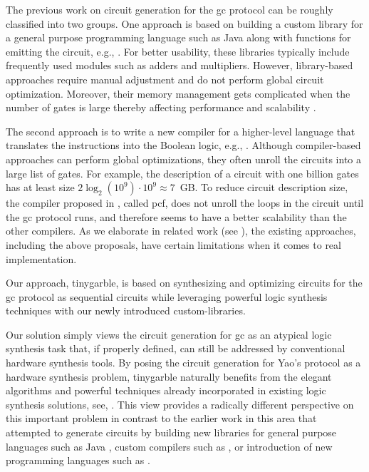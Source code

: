 The previous work on circuit generation for the \acrshort{gc} protocol can be roughly classified into two groups.
One approach is based on building a custom library for a general purpose programming language such as Java along with functions for emitting the circuit, e.g., \cite{huang2011faster,malka2011vmcrypt,henecka2013faster}.
For better usability, these libraries typically include frequently used modules such as adders and multipliers.
However, library-based approaches require manual adjustment and do not perform global circuit optimization.
Moreover, their memory management gets complicated when the number of gates is large thereby affecting performance and scalability \cite{henecka2013faster}.

The second approach is to write a new compiler for a higher-level language that translates the instructions into the Boolean logic, e.g., \cite{malkhi2004fairplay,kreuter2012billion,kreuter2013pcf,franz2014cbmc}.
Although compiler-based approaches can perform global optimizations, they often unroll the circuits into a large list of gates.
For example, the description of a circuit with one billion gates has at least size $2 \log_2 (10^9) \cdot 10^{9} \approx 7$~GB.
To reduce circuit description size, the compiler proposed in \cite{kreuter2013pcf}, called \gls{pcf}, does not unroll the loops in the circuit until the \acrshort{gc} protocol runs, and therefore seems to have a better scalability than the other compilers.
As we elaborate in related work (see ), the existing approaches, including the above proposals, have certain limitations when it comes to real implementation.

Our approach, \gls{tinygarble}, is based on synthesizing and optimizing circuits for the \acrshort{gc} protocol as sequential circuits while leveraging powerful logic synthesis techniques with our newly introduced custom-libraries.

Our solution simply views the circuit generation for \acrshort{gc} as an atypical logic synthesis task that, if properly defined, can still be addressed by conventional hardware synthesis tools.
By posing the circuit generation for Yao's protocol as a hardware synthesis problem, \gls{tinygarble} naturally benefits from the elegant algorithms and powerful techniques already incorporated in existing logic synthesis solutions, see, \cite{sentovich1992sis,micheli1994synthesis,devadas1994logic,brayton1987mis}.
This view provides a radically different perspective on this important problem in contrast to the earlier work in this area that attempted to generate circuits by building new libraries for general purpose languages such as Java \cite{huang2011faster,malka2011vmcrypt}, custom compilers such as \cite{kreuter2013pcf,franz2014cbmc}, or introduction of new programming languages such as \cite{malkhi2004fairplay,rastogi2014wysteria}.

